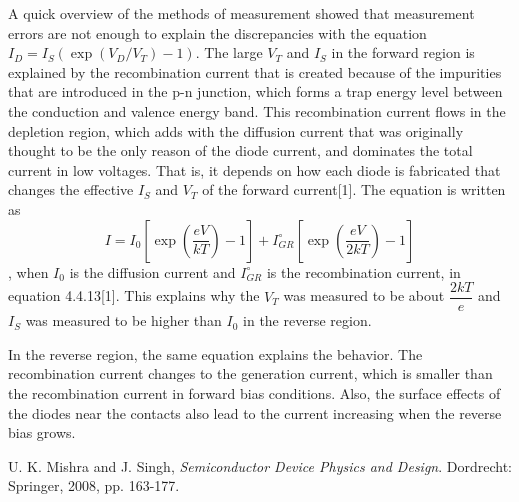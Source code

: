 \documentclass[a4paper, itemph]{oblivoir}
\theoremstyle{definition}
\begin{document}
A quick overview of the methods of measurement showed that measurement errors are not enough to explain the discrepancies with the equation $I_D=I_S(\exp(V_D/V_T)-1)$. The large $V_T$ and $I_S$ in the forward region is explained by the recombination current that is created because of the impurities that are introduced in the p-n junction, which forms a trap energy level between the conduction and valence energy band. This recombination current flows in the depletion region, which adds with the diffusion current that was originally thought to be the only reason of the diode current, and dominates the total current in low voltages. That is, it depends on how each diode is fabricated that changes the effective $I_S$ and $V_T$ of the forward current[1]. The equation is written as 
\[
I=I_0\left[\exp\left(\frac{eV}{kT}\right)-1\right]+I_{GR}^{\circ}\left[\exp\left(\frac{eV}{2kT}\right)-1\right]
\]
, when $I_0$ is the diffusion current and $I_{GR}^{\circ}$ is the recombination current, in equation 4.4.13[1]. This explains why the $V_T$ was measured to be about $\dfrac{2kT}{e}$ and $I_S$ was measured to be higher than $I_0$ in the reverse region.

In the reverse region, the same equation explains the behavior. The recombination current changes to the generation current, which is smaller than the recombination current in forward bias conditions. Also, the surface effects of the diodes near the contacts also lead to the current increasing when the reverse bias grows.
\begin{thebibliography}{}

 U. K. Mishra and J. Singh, \textit{Semiconductor Device Physics and Design}. Dordrecht: Springer, 2008, pp. 163-177.

\end{thebibliography}
\end{document}
